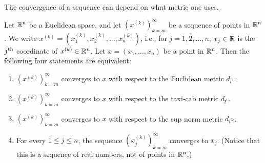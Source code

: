 \begin{note}
  The convergence of a sequence can depend on what metric one uses.
\end{note}

\setcounter{thm}{17}
\begin{prop}\label{ii:1.1.18}
  Let \(\mathbb{R}^n\) be a Euclidean space, and let \((x^{(k)})_{k = m}^\infty\) be a sequence of points in \(\mathbb{R}^n\).
  We write \(x^{(k)} = (x_1^{(k)}, x_2^{(k)}, \dots, x_n^{(k)})\), i.e., for \(j = 1, 2, \dots, n\), \(x_j \in \mathbb{R}\) is the \(j^{\operatorname{th}}\) coordinate of \(x^{(k)} \in \mathbb{R}^n\).
  Let \(x = (x_1, \dots, x_n)\) be a point in \(\mathbb{R}^n\).
  Then the following four statements are equivalent:
  \begin{enumerate}
    \item \((x^{(k)})_{k = m}^\infty\) converges to \(x\) with respect to the Euclidean metric \(d_{l^2}\).
    \item \((x^{(k)})_{k = m}^\infty\) converges to \(x\) with respect to the taxi-cab metric \(d_{l^1}\).
    \item \((x^{(k)})_{k = m}^\infty\) converges to \(x\) with respect to the sup norm metric \(d_{l^\infty}\).
    \item For every \(1 \leq j \leq n\), the sequence \((x_j^{(k)})_{k = m}^\infty\) converges to \(x_j\).
          (Notice that this is a sequence of real numbers, not of points in \(\mathbb{R}^n\).)
  \end{enumerate}
\end{prop}

